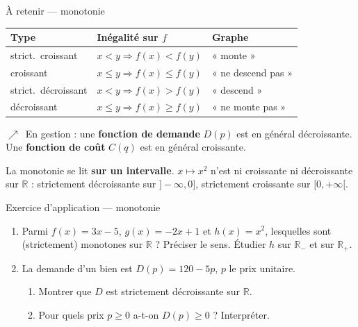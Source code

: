 \documentclass[aspectratio=169,11pt]{beamer}
\providecommand{\faChartLine}{$\nearrow$}
\newcommand{\R}{\mathbb{R}}
\newcommand{\key}[1]{\textbf{\color{DarkBlue}#1}}
\newcommand{\important}[1]{\textbf{\color{DarkRed}#1}}
\begin{document}
\begin{frame}[shrink=12]{À retenir --- monotonie}
	\begin{center}
		\renewcommand{\arraystretch}{1.25}
		\small
		\begin{tabular}{lll}
			\toprule
			\textbf{Type} & \textbf{Inégalité sur $f$} & \textbf{Graphe} \\
			\midrule
			strict.\ croissant & $x<y\Rightarrow f(x)<f(y)$ & « monte » \\
			croissant & $x\le y\Rightarrow f(x)\le f(y)$ & « ne descend pas » \\
			strict.\ décroissant & $x<y\Rightarrow f(x)>f(y)$ & « descend » \\
			décroissant & $x\le y\Rightarrow f(x)\ge f(y)$ & « ne monte pas » \\
			\bottomrule
		\end{tabular}
	\end{center}
	\vspace{0.2cm}
	\begin{applicationbox}
		\faChartLine\ En gestion : une \key{fonction de demande} $D(p)$ est en général
		décroissante. Une \key{fonction de coût} $C(q)$ est en général croissante.
	\end{applicationbox}
	\vspace{0.15cm}
	\begin{attentionbox}
		La monotonie se lit \important{sur un intervalle}. $x\mapsto x^2$ n'est ni croissante
		ni décroissante sur $\R$ : strictement décroissante sur $]-\infty,0]$,
		strictement croissante sur $[0,+\infty[$.
	\end{attentionbox}
\end{frame}

\begin{frame}{Exercice d'application --- monotonie}
	\begin{exercicebox}[Exercice 2.2]
		\begin{enumerate}
			\item Parmi $f(x)=3x-5$, $g(x)=-2x+1$ et $h(x)=x^2$, lesquelles sont
			(strictement) monotones sur $\R$ ? Préciser le sens. Étudier $h$ sur
			$\R_-$ et sur $\R_+$.
			\item La demande d'un bien est $D(p)=120-5p$, $p$ le prix unitaire.
			\begin{enumerate}
				\item Montrer que $D$ est strictement décroissante sur $\R$.
				\item Pour quels prix $p\ge 0$ a-t-on $D(p)\ge 0$ ? Interpréter.
			\end{enumerate}
		\end{enumerate}
	\end{exercicebox}
\end{frame}
\end{document}
